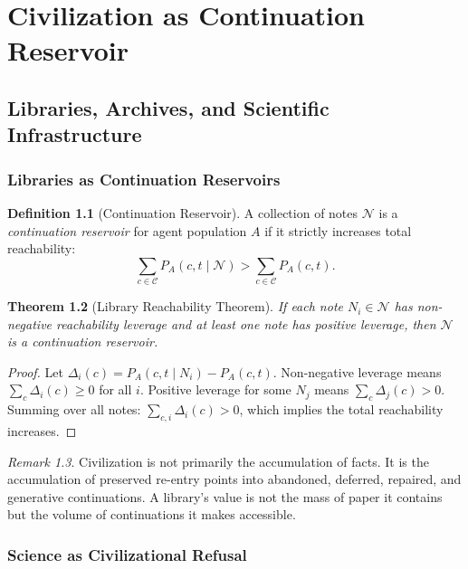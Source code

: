 \documentclass[12pt, a4paper, openany]{book}
\theoremstyle{plain}
\newtheorem{theorem}{Theorem}[chapter]
\theoremstyle{definition}
\newtheorem{definition}[theorem]{Definition}
\theoremstyle{remark}
\newtheorem{remark}[theorem]{Remark}
\newcommand{\calC}{\mathcal{C}}
\newcommand{\calN}{\mathcal{N}}
\begin{document}
\part{Civilization as Continuation Reservoir}

\chapter{Libraries, Archives, and Scientific Infrastructure}

\section{Libraries as Continuation Reservoirs}

\begin{definition}[Continuation Reservoir]
A collection of notes $\calN$ is a \emph{continuation reservoir} for agent
population $A$ if it strictly increases total reachability:
\[
\sum_{c \in \calC} P_A(c, t \mid \calN) > \sum_{c \in \calC} P_A(c, t).
\]
\end{definition}

\begin{theorem}[Library Reachability Theorem]
If each note $N_i \in \calN$ has non-negative reachability leverage and at
least one note has positive leverage, then $\calN$ is a continuation reservoir.
\end{theorem}

\begin{proof}
Let $\Delta_i(c) = P_A(c, t \mid N_i) - P_A(c, t)$. Non-negative leverage
means $\sum_c \Delta_i(c) \geq 0$ for all $i$. Positive leverage for some $N_j$
means $\sum_c \Delta_j(c) > 0$. Summing over all notes:
$\sum_{c,i} \Delta_i(c) > 0$, which implies the total reachability increases.
\end{proof}

\begin{remark}
Civilization is not primarily the accumulation of facts. It is the accumulation
of preserved re-entry points into abandoned, deferred, repaired, and generative
continuations. A library's value is not the mass of paper it contains but the
volume of continuations it makes accessible.
\end{remark}

\section{Science as Civilizational Refusal}
\end{document}
